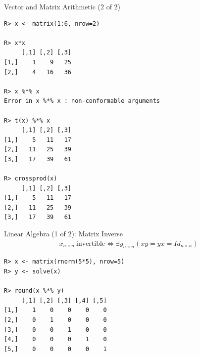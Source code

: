 \begin{frame}
  \begin{exampleblock}{Vector and Matrix Arithmetic (2 of 2)}\pause
  
\begin{lstlisting}[backgroundcolor=\color{white},basicstyle=\ttfamily\color{
dkgray}\scriptsize,keywordstyle=\color{black}, 
  commentstyle=\color{orange},stringstyle=\color{mauve}]
R> x <- matrix(1:6, nrow=2)

R> x*x
     [,1] [,2] [,3]
[1,]    1    9   25
[2,]    4   16   36

R> x %*% x
Error in x %*% x : non-conformable arguments

R> t(x) %*% x
     [,1] [,2] [,3]
[1,]    5   11   17
[2,]   11   25   39
[3,]   17   39   61

R> crossprod(x)
     [,1] [,2] [,3]
[1,]    5   11   17
[2,]   11   25   39
[3,]   17   39   61
\end{lstlisting}
  \end{exampleblock}
\end{frame}

\begin{frame}[fragile]
  \begin{exampleblock}{Linear Algebra (1 of 2): Matrix Inverse}\pause
  \begin{align*}
    x_{n\times n}\ \text{invertible} \iff \exists y_{n\times n} \left( xy = yx = 
Id_{n\times n} \right)
  \end{align*}
\begin{lstlisting}[backgroundcolor=\color{white},basicstyle=\ttfamily\color{
dkgray}\scriptsize,keywordstyle=\color{black}, 
  commentstyle=\color{orange},stringstyle=\color{mauve}]
R> x <- matrix(rnorm(5*5), nrow=5)
R> y <- solve(x)

R> round(x %*% y)
     [,1] [,2] [,3] [,4] [,5]
[1,]    1    0    0    0    0
[2,]    0    1    0    0    0
[3,]    0    0    1    0    0
[4,]    0    0    0    1    0
[5,]    0    0    0    0    1
\end{lstlisting}
  \end{exampleblock}
\end{frame}




